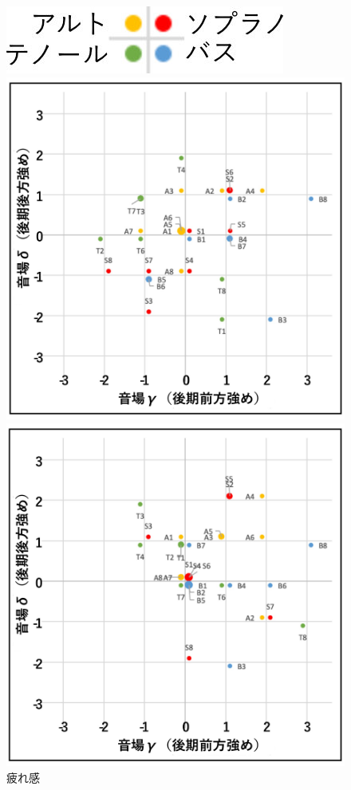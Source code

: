 \documentclass[11pt,a4j]{jreport}
\begin{document}
\begin{figure}[H]
  \begin{minipage}{1\linewidth}
    \centering
    \includegraphics[scale=.7]{images/subjectiveExp/scat_0_legend.jpg}
  \end{minipage}

  \begin{minipage}{0.5\linewidth}
    \centering
    \includegraphics[width=.9\linewidth]{images/subjectiveExp/scat_late_08tiredness.pdf}
    \caption*{疲れ感}
  \end{minipage}%
  \begin{minipage}{0.5\linewidth}
    \centering
    \includegraphics[width=.9\linewidth]{images/subjectiveExp/scat_late_09dynamics.pdf}

\end{minipage}
\end{figure}
\end{document}
